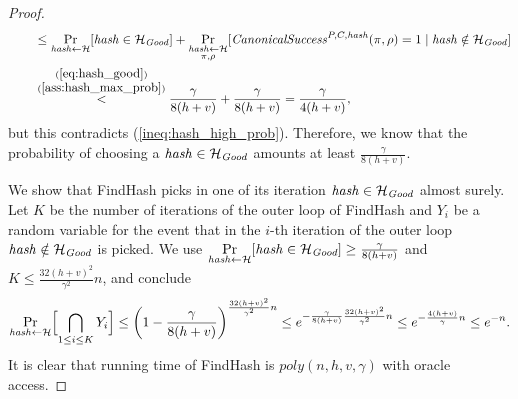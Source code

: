 \begin{proof}
\begin{align*}
  & \mbox\qquad \leq \underset{\operatorname{\mathit{hash}} \leftarrow \mathcal{H}}{\Pr}[\operatorname{\mathit{hash}} \in \mathcal{H}_{\mathit{Good}}] +
  \underset{\substack{\operatorname{\mathit{hash}} \leftarrow \mathcal{H} \\ \pi, \rho}}{\Pr}[\operatorname{\mathit{CanonicalSuccess}}^{P,C,\operatorname{\mathit{hash}}}(\pi, \rho) = 1 \mid \operatorname{\mathit{hash}} \notin \mathcal{H}_{\mathit{Good}}] \\
  & \mbox\qquad  \stackrel{\substack{ (\ref{eq:hash_good}) \\ (\ref{ass:hash_max_prob})}}{<} \frac{\gamma}{8(h+v)} + \frac{\gamma}{8(h+v)} = \frac{\gamma}{4(h+v)},
\end{align*}
but this contradicts (\ref{ineq:hash_high_prob}).
Therefore, we know that the probability of choosing a $\operatorname{\mathit{hash}} \in \mathcal{H}_{\mathit{Good}}$ amounts at least $\frac{\gamma}{8(h+v)}$.

We show that FindHash picks in one of its iteration $\operatorname{\mathit{hash}} \in \mathcal{H}_{\mathit{Good}}$ almost surely.
Let $K$ be the number of iterations of the outer loop of FindHash and $Y_i$ be a random variable for the event
that in the $i$-th iteration of the outer loop $\operatorname{\mathit{hash}} \notin \mathcal{H}_{\mathit{Good}}$ is picked.
We use $\underset{\operatorname{\mathit{hash}} \leftarrow \mathcal{H}}{\Pr}[\operatorname{\mathit{hash}} \in \mathcal{H}_{\textit{Good}}] \geq \frac{\gamma}{8(h+v)}$ and $K \leq \frac{32(h+v)^2}{\gamma^2}n$, and conclude
\begin{align*}
  \underset{\operatorname{\mathit{hash}} \leftarrow \mathcal{H}}{\Pr}\Bigl[ \bigcap_{1 \leq i \leq K} Y_i \Bigr] \leq \left(1 - \frac{\gamma}{8(h+v)}\right)^{\frac{32(h+v)^2}{\gamma^2}n}
    \leq e^{-\frac{\gamma}{8(h+v)} \frac{32(h+v)^2}{\gamma^2}n}
    \leq e^{-\frac{4(h+v)}{\gamma}n} \leq e^{-n}.
\end{align*}
It is clear that running time of FindHash is $\mathit{poly}(n,h,v,\gamma)$ with oracle access.
\end{proof}
